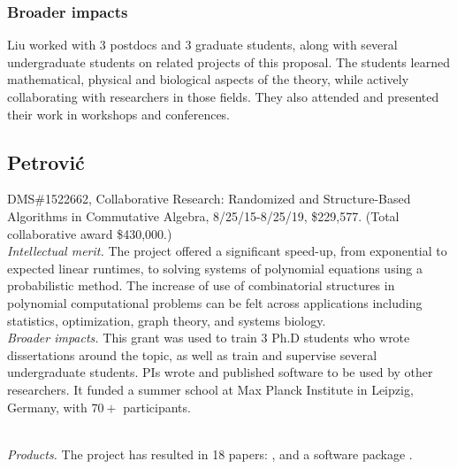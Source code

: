 \documentclass[11pt]{NSFamsart}
\begin{document}
{%

\subsubsection*{Broader impacts}  Liu worked with
3 postdocs and 3 graduate students, along with several undergraduate students 
on related projects of this proposal. 
The students learned mathematical, physical and biological
aspects of the theory, while actively collaborating  with researchers in those fields.
They also attended and presented their work in workshops and conferences.


\subsection*{Petrovi\'c} 
DMS\#1522662, Collaborative Research: Randomized and Structure-Based Algorithms in Commutative Algebra, 8/25/15-8/25/19, \$229,577. (Total collaborative award \$430,000.)
\\
\emph{Intellectual merit.} The project offered  a  significant speed-up, from exponential  to expected linear runtimes, to   solving systems of polynomial equations %
using a probabilistic method.  The increase of use of combinatorial structures in polynomial computational problems can be felt across applications including statistics, optimization, graph theory, and systems biology. 
 \\
\emph{Broader impacts.} This grant was used to train 3 Ph.D students who wrote dissertations around the topic, as well as train and supervise several undergraduate students. PIs wrote and published software to be used by other researchers. It funded a  summer school at Max Planck Institute in Leipzig, Germany,  with $70+$ participants. 

\\
\emph{Products.}
 The project has resulted in 18 papers: \cite{GKP-fienberg, RMI, semigroups, AlgStatNtwk-ARSIA, WhatIsMB, jalgstat-fienberg-editorial, karwa2016dergms, hypergraphs-toric, jesus1, jesus2, jesus3, jesus4, jesus5, jesus6, jesus7, algebraicViolators, bouquets, surveyAlgStatCONMchp},   
 and a software package \cite{RMIm2}. 

}
\end{document}

